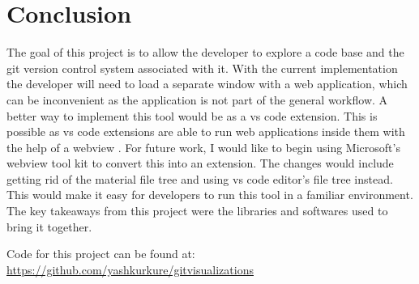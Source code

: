 \section{Conclusion}

The goal of this project is to allow the developer to explore a code base and the git version control system associated with it. With the current implementation the developer will need to load a separate window with a web application, which can be inconvenient as the application is not part of the general workflow. A better way to implement this tool would be as a vs code extension. This is possible as vs code extensions are able to run web applications inside them with the help of a webview \cite{vscodewebview}. For future work, I would like to begin using Microsoft's webview tool kit \cite{vscodewebviewtoolkit} to convert this into an extension. The changes would include getting rid of the material file tree and using vs code editor's file tree instead. This would make it easy for developers to run this tool in a familiar environment. The key takeaways from this project were the libraries and softwares used to bring it together.

Code for this project can be found at: \url{https://github.com/yashkurkure/gitvisualizations}